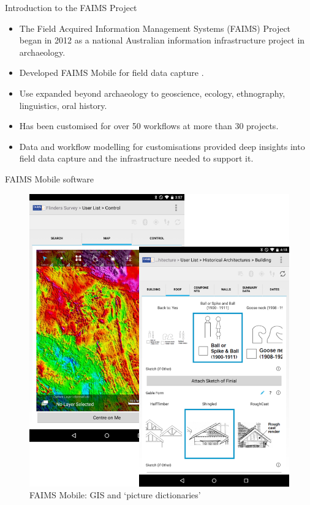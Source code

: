 \documentclass[aspectratio=169, 12pt]{beamer} %
\begin{document}
\begin{frame}{Introduction to the FAIMS Project}
    \begin{itemize}[label=\textbullet]
        \item The Field Acquired Information Management Systems (FAIMS) Project began in 2012 as a national Australian information infrastructure project in archaeology.
        \item Developed FAIMS Mobile for field data capture \cite{Ballsun-Stanton2018-zd}.
        \item Use expanded beyond archaeology to geoscience, ecology, ethnography, linguistics, oral history.
        \item Has been customised for over 50 workflows at more than 30 projects. 
        \item Data and workflow modelling for customisations provided deep insights into field data capture and the infrastructure needed to support it.
    \end{itemize}
\end{frame}

\begin{frame}{FAIMS Mobile software}
 \begin{figure}[H]
    \centering
        \includegraphics[height=.75\textheight]{figures/FAIMS-screenshots.png}
        \caption{FAIMS Mobile: GIS and `picture dictionaries'}
        \label{fig:figure10}
 \end{figure}
\end{frame}
\end{document}
